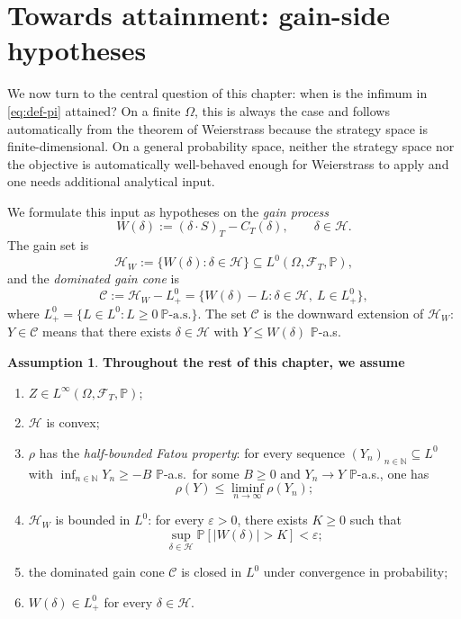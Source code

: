 \documentclass[11pt,a4paper]{report}
\numberwithin{equation}{chapter}
\theoremstyle{plain}
\theoremstyle{definition}
\newtheorem{assumption}[proposition]{Assumption}
\newcommand{\PP}{\mathbb{P}}
\newcommand{\N}{\mathbb{N}}
\newcommand{\F}{\mathcal{F}}
\newcommand{\HH}{\mathcal{H}}
\newcommand{\CC}{\mathcal{C}}
\begin{document}
\section{Towards attainment: gain-side hypotheses}\label{sec:gain-side}

We now turn to the central question of this chapter: when is the infimum in \eqref{eq:def-pi} attained? On a finite $\Omega$, this is always the case and follows automatically from the theorem of Weierstrass because the strategy space is finite-dimensional. On a general probability space, neither the strategy space nor the objective is automatically well-behaved enough for Weierstrass to apply and one needs additional analytical input.

We formulate this input as hypotheses on the \emph{gain process}
\[
    W(\delta):=(\delta\cdot S)_T-C_T(\delta),\qquad\delta\in\HH.
\]
The gain set is
\[
    \HH_W:=\{W(\delta):\delta\in\HH\}\subseteq L^0(\Omega,\F_T,\PP),
\]
and the \emph{dominated gain cone} is
\[
    \CC:=\HH_W-L^0_+=\{W(\delta)-L:\delta\in\HH,\ L\in L^0_+\},
\]
where $L^0_+=\{L\in L^0:L\ge0\ \PP\text{-a.s.}\}$. The set $\CC$ is the downward extension of $\HH_W$: $Y\in\CC$ means that there exists $\delta\in\HH$ with $Y\le W(\delta)$ $\PP$-a.s.

\begin{assumption}\label{ass:main}
    \textbf{Throughout the rest of this chapter, we assume}
    \begin{enumerate}[leftmargin=*,label=\textup{(A\arabic*)}]
        \item $Z\in L^\infty(\Omega,\F_T,\PP)$;
        \item $\HH$ is convex;
        \item $\rho$ has the \emph{half-bounded Fatou property}: for every sequence $(Y_n)_{n\in\N}\subseteq L^0$ with $\inf_{n\in\N}Y_n\ge-B$ $\PP$-a.s.\ for some $B\ge0$ and $Y_n\to Y$ $\PP$-a.s., one has
              \[
                  \rho(Y)\le\liminf_{n\to\infty}\rho(Y_n);
              \]
        \item $\HH_W$ is bounded in $L^0$: for every $\varepsilon>0$, there exists $K\ge0$ such that
              \[
                  \sup_{\delta\in\HH}\PP[|W(\delta)|>K]<\varepsilon;
              \]
        \item the dominated gain cone $\CC$ is closed in $L^0$ under convergence in probability;
        \item $W(\delta)\in L^0_+$ for every $\delta\in\HH$.
    \end{enumerate}
\end{assumption}
\end{document}
